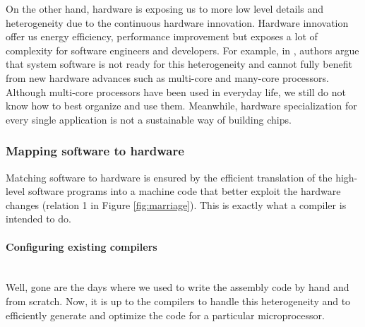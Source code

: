 On the other hand, hardware is exposing us to more low level details and heterogeneity due to the continuous hardware innovation. 
Hardware innovation offer us energy efficiency, performance improvement but exposes a lot of complexity for software engineers and developers.
For example, in \cite{he2010computer}, authors argue that system software is not ready for this heterogeneity and cannot fully benefit from new hardware advances such as multi-core and many-core processors. Although multi-core processors have been used in everyday life, we still do not know how to best organize and use them. 
Meanwhile, hardware specialization for every single application is not a sustainable way of building chips.

\subsubsection{Mapping software to hardware}
\label{Mapping software to hardware}
Matching software to hardware is ensured by the efficient translation of the high-level software programs into a machine code that better exploit the hardware changes (relation 1 in Figure \ref{fig:marriage}). This is exactly what a compiler is intended to do.

\paragraph{Configuring existing compilers}~\\ 
Well, gone are the days where we used to write the assembly code by hand and from scratch. Now, it is up to the compilers to handle this heterogeneity and to efficiently generate and optimize the code for a particular microprocessor. 

